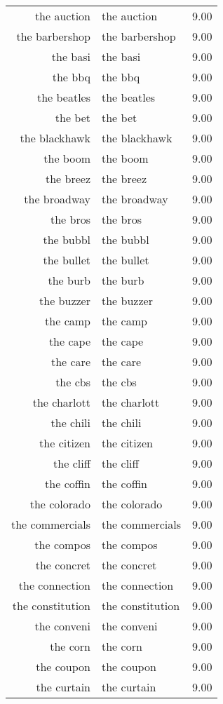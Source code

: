 \begin{table}[ht]
\begin{tabular}{rlr}
  the auction & the auction & 9.00 \\ 
  the barbershop & the barbershop & 9.00 \\ 
  the basi & the basi & 9.00 \\ 
  the bbq & the bbq & 9.00 \\ 
  the beatles & the beatles & 9.00 \\ 
  the bet & the bet & 9.00 \\ 
  the blackhawk & the blackhawk & 9.00 \\ 
  the boom & the boom & 9.00 \\ 
  the breez & the breez & 9.00 \\ 
  the broadway & the broadway & 9.00 \\ 
  the bros & the bros & 9.00 \\ 
  the bubbl & the bubbl & 9.00 \\ 
  the bullet & the bullet & 9.00 \\ 
  the burb & the burb & 9.00 \\ 
  the buzzer & the buzzer & 9.00 \\ 
  the camp & the camp & 9.00 \\ 
  the cape & the cape & 9.00 \\ 
  the care & the care & 9.00 \\ 
  the cbs & the cbs & 9.00 \\ 
  the charlott & the charlott & 9.00 \\ 
  the chili & the chili & 9.00 \\ 
  the citizen & the citizen & 9.00 \\ 
  the cliff & the cliff & 9.00 \\ 
  the coffin & the coffin & 9.00 \\ 
  the colorado & the colorado & 9.00 \\ 
  the commercials & the commercials & 9.00 \\ 
  the compos & the compos & 9.00 \\ 
  the concret & the concret & 9.00 \\ 
  the connection & the connection & 9.00 \\ 
  the constitution & the constitution & 9.00 \\ 
  the conveni & the conveni & 9.00 \\ 
  the corn & the corn & 9.00 \\ 
  the coupon & the coupon & 9.00 \\ 
  the curtain & the curtain & 9.00 \\ 

\end{tabular}
\end{table}
